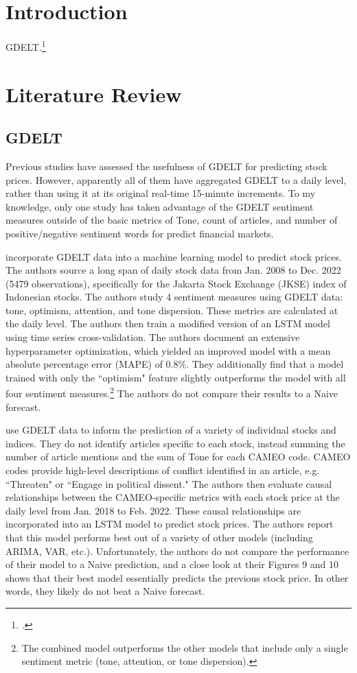 \documentclass[12pt]{article}
\begin{document}
\section{Introduction}

GDELT.\footnote{\citet{leetaru2013gdelt}.}
\section{Literature Review}
\subsection{GDELT}
Previous studies have assessed the usefulness of GDELT for predicting stock prices. However, apparently all of them have aggregated GDELT to a daily level, rather than using it at its original real-time 15-minute increments. To my knowledge, only one study has taken advantage of the GDELT sentiment measures outside of the basic metrics of Tone, count of articles, and number of positive/negative sentiment words for predict financial markets.

\citet{nashir2023indonesian} incorporate GDELT data into a machine learning model to predict stock prices. The authors source a long span of daily stock data from Jan. 2008 to Dec. 2022 (5479 observations), specifically for the Jakarta Stock Exchange (JKSE) index of Indonesian stocks. The authors study 4 sentiment measures using GDELT data: tone, optimism, attention, and tone dispersion. These metrics are calculated at the daily level. The authors then train a modified version of an LSTM model using time series cross-validation. The authors document an extensive hyperparameter optimization, which yielded an improved model with a mean absolute percentage error (MAPE) of 0.8\%. They additionally find that a model trained with only the ``optimism" feature slightly outperforms the model with all four sentiment measures.\footnote{The combined model outperforms the other models that include only a single sentiment metric (tone, attention, or tone dispersion).} The authors do not compare their results to a Naive forecast.

\citet{wang2024ensemble} use GDELT data to inform the prediction of a variety of individual stocks and indices. They do not identify articles specific to each stock, instead summing the number of article mentions and the sum of Tone for each CAMEO code. CAMEO codes provide high-level descriptions of conflict identified in an article, e.g. ``Threaten" or ``Engage in political dissent." The authors then evaluate causal relationships between the CAMEO-specific metrics with each stock price at the daily level from Jan. 2018 to Feb. 2022. These causal relationships are incorporated into an LSTM model to predict stock prices. The authors report that this model performs best out of a variety of other models (including ARIMA, VAR, etc.). Unfortunately, the authors do not compare the performance of their model to a Naive prediction, and a close look at their Figures 9 and 10 shows that their best model essentially predicts the previous stock price. In other words, they likely do not beat a Naive forecast.
\end{document}
